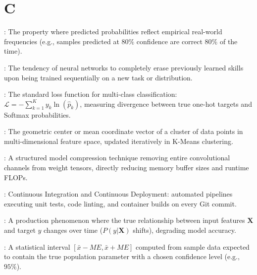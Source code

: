 \section*{C}
\begin{description}[leftmargin=!,labelwidth=4.5cm,itemsep=1.5ex]
\item[\textbf{Calibration}\hfill \textnormal{\sffamily\scriptsize\color{keyideablue}[Evaluation]}]: The property where predicted probabilities reflect empirical real-world frequencies (e.g., samples predicted at $80\%$ confidence are correct $80\%$ of the time).
\item[\textbf{Catastrophic Forgetting}\hfill \textnormal{\sffamily\scriptsize\color{keyideablue}[Deep Learning]}]: The tendency of neural networks to completely erase previously learned skills upon being trained sequentially on a new task or distribution.
\item[\textbf{Categorical Cross-Entropy}\hfill \textnormal{\sffamily\scriptsize\color{keyideablue}[Deep Learning]}]: The standard loss function for multi-class classification: $\mathcal{L} = -\sum_{k=1}^K y_k \ln(\hat{p}_k)$, measuring divergence between true one-hot targets and Softmax probabilities.
\item[\textbf{Centroid}\hfill \textnormal{\sffamily\scriptsize\color{keyideablue}[Classical ML]}]: The geometric center or mean coordinate vector of a cluster of data points in multi-dimensional feature space, updated iteratively in K-Means clustering.
\item[\textbf{Channel Pruning}\hfill \textnormal{\sffamily\scriptsize\color{keyideablue}[TinyML]}]: A structured model compression technique removing entire convolutional channels from weight tensors, directly reducing memory buffer sizes and runtime FLOPs.
\item[\textbf{CI/CD}\hfill \textnormal{\sffamily\scriptsize\color{keyideablue}[MLOps]}]: Continuous Integration and Continuous Deployment: automated pipelines executing unit tests, code linting, and container builds on every Git commit.
\item[\textbf{Concept Drift}\hfill \textnormal{\sffamily\scriptsize\color{keyideablue}[MLOps]}]: A production phenomenon where the true relationship between input features $\mathbf{X}$ and target $y$ changes over time ($P(y|\mathbf{X})$ shifts), degrading model accuracy.
\item[\textbf{Confidence Interval}\hfill \textnormal{\sffamily\scriptsize\color{keyideablue}[Statistics]}]: A statistical interval $[\bar{x} - ME, \bar{x} + ME]$ computed from sample data expected to contain the true population parameter with a chosen confidence level (e.g., $95\%$).

\end{description}

